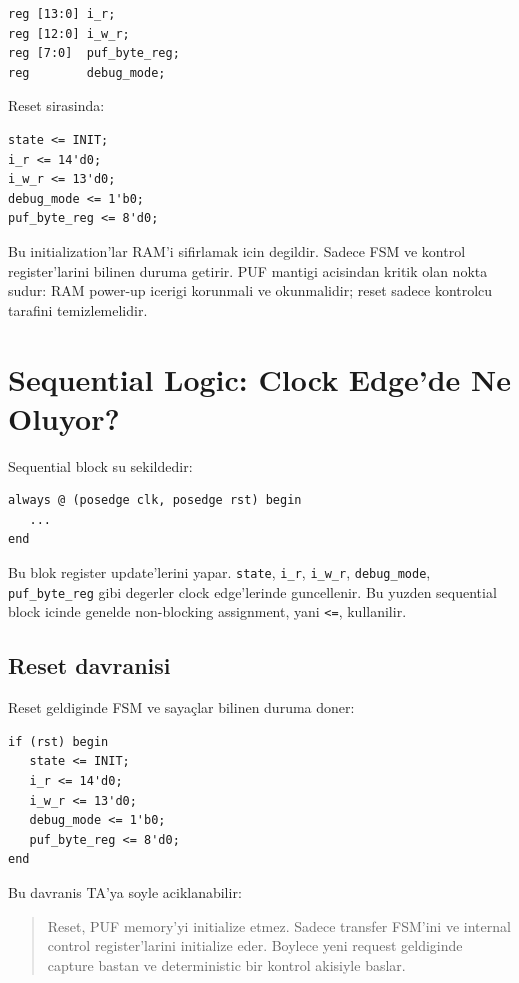 \documentclass[11pt,a4paper]{article}
\begin{document}
\begin{lstlisting}[style=verilogstyle]
reg [13:0] i_r;
reg [12:0] i_w_r;
reg [7:0]  puf_byte_reg;
reg        debug_mode;
\end{lstlisting}

Reset sirasinda:
\begin{lstlisting}[style=verilogstyle]
state <= INIT;
i_r <= 14'd0;
i_w_r <= 13'd0;
debug_mode <= 1'b0;
puf_byte_reg <= 8'd0;
\end{lstlisting}

Bu initialization'lar RAM'i sifirlamak icin degildir. Sadece FSM ve kontrol register'larini bilinen duruma getirir. PUF mantigi acisindan kritik olan nokta sudur: RAM power-up icerigi korunmali ve okunmalidir; reset sadece kontrolcu tarafini temizlemelidir.

\section{Sequential Logic: Clock Edge'de Ne Oluyor?}

Sequential block su sekildedir:
\begin{lstlisting}[style=verilogstyle]
always @ (posedge clk, posedge rst) begin
   ...
end
\end{lstlisting}

Bu blok register update'lerini yapar. \texttt{state}, \texttt{i\_r}, \texttt{i\_w\_r}, \texttt{debug\_mode}, \texttt{puf\_byte\_reg} gibi degerler clock edge'lerinde guncellenir. Bu yuzden sequential block icinde genelde non-blocking assignment, yani \texttt{<=}, kullanilir.

\subsection{Reset davranisi}
Reset geldiginde FSM ve sayaçlar bilinen duruma doner:
\begin{lstlisting}[style=verilogstyle]
if (rst) begin
   state <= INIT;
   i_r <= 14'd0;
   i_w_r <= 13'd0;
   debug_mode <= 1'b0;
   puf_byte_reg <= 8'd0;
end
\end{lstlisting}

Bu davranis TA'ya soyle aciklanabilir:

\begin{quote}
Reset, PUF memory'yi initialize etmez. Sadece transfer FSM'ini ve internal control register'larini initialize eder. Boylece yeni request geldiginde capture bastan ve deterministic bir kontrol akisiyle baslar.
\end{quote}
\end{document}
